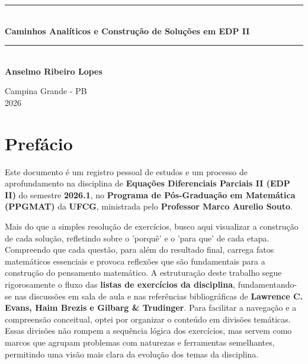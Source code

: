 \documentclass[10pt,a4paper]{article}
\begin{document}
\nocite{*}
	\begin{titlepage}
		\begin{center}
			\vspace*{4cm}
			
			\rule{\linewidth}{0.5mm} \\[0.4cm]
			{ \LARGE \bfseries Caminhos Analíticos e Construção de Soluções em EDP II \\[0.4cm] }
			\rule{\linewidth}{0.5mm} \\[2cm]
			
			\large
			\textbf{Anselmo Ribeiro Lopes}\\
			
			\vfill
			
			\large
			Campina Grande - PB\\
			2026
		\end{center}
	\end{titlepage}
	
	\section*{Prefácio}
	
	Este documento é um registro pessoal de estudos e um processo de aprofundamento na disciplina de \textbf{Equações Diferenciais Parciais II (EDP II)} do semestre \textbf{2026.1}, no \textbf{Programa de Pós-Graduação em Matemática (PPGMAT)} da \textbf{UFCG}, ministrada pelo \textbf{Professor Marco Aurelio Souto}.
	
	Mais do que a simples resolução de exercícios, busco aqui visualizar a construção de cada solução, refletindo sobre o 'porquê' e o 'para que' de cada etapa. Compreendo que cada questão, para além do resultado final, carrega fatos matemáticos essenciais e provoca reflexões que são fundamentais para a construção do pensamento matemático. A estruturação deste trabalho segue rigorosamente o fluxo das \textbf{listas de exercícios da disciplina}, fundamentando-se nas discussões em sala de aula e nas referências bibliográficas de \textbf{Lawrence C. Evans, Haim Brezis e Gilbarg \& Trudinger}. Para facilitar a navegação e a compreensão conceitual, optei por organizar o conteúdo em divisões temáticas. Essas divisões não rompem a sequência lógica dos exercícios, mas servem como marcos que agrupam problemas com naturezas e ferramentas semelhantes, permitindo uma visão mais clara da evolução dos temas da disciplina.
	
\end{document}

